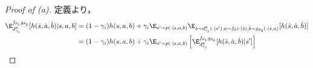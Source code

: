 \documentclass[a4paper,10pt,dvipdfmx]{jsarticle}
\begin{document}
\begin{proof}[Proof of (a)]
    定義より，
    \begin{subequations}
    \begin{align}
        \E_{d_{\gamma_i}^{\theta}}^{f_{\theta_1}g_{\theta_2}}[h(\dot{s},\dot{a},\dot{b})|s,a,b]&= (1-\gamma_i)h(s,a,b)+\gamma_i\E_{s'\sim p(\cdot|s,a,b)}\E_{\dot{s}\sim d_{\gamma_i}^{\theta}(\cdot|s'),\dot{a}\sim f_{\theta}(\cdot|\dot{s}),\dot{b}\sim g_{\theta_2}(\cdot|\dot{s},\dot{a})}[h(\dot{s},\dot{a},\dot{b})]\\
        &=(1-\gamma_i)h(s,a,b)+\gamma_i\E_{s'\sim p(\cdot|s,a,b)}\left[\E_{d_{\gamma_i}^{\theta}}^{f_{\theta_1}g_{\theta_2}}[h(\dot{s},\dot{a},\dot{b})|s']\right]
    \end{align}
    \end{subequations}
\end{proof}
\end{document}
